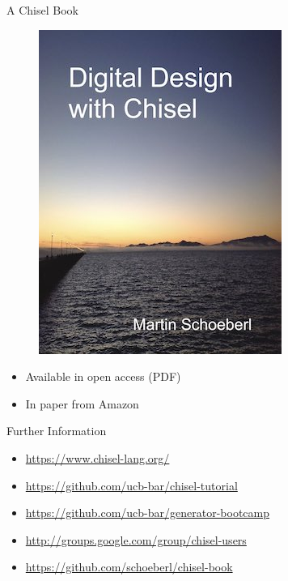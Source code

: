 \documentclass[xcolor=pdflatex,dvipsnames,table]{beamer}
\begin{document}
\begin{frame}[fragile]{A Chisel Book}
\begin{figure}
    \centering
    \includegraphics[scale=0.4]{../cover-small}
\end{figure}

\begin{itemize}
\item Available in open access (PDF)
\item In paper from Amazon
\end{itemize}
\end{frame}

\begin{frame}[fragile]{Further Information}
\begin{itemize}
\item \url{https://www.chisel-lang.org/}
\item \url{https://github.com/ucb-bar/chisel-tutorial}
\item \url{https://github.com/ucb-bar/generator-bootcamp}
\item \url{http://groups.google.com/group/chisel-users}
\item \url{https://github.com/schoeberl/chisel-book}
\end{itemize}
\end{frame}
\end{document}
